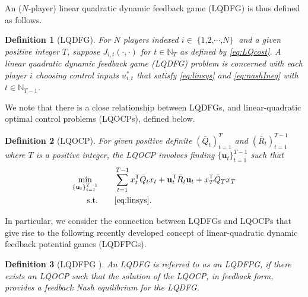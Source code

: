 \documentclass[letterpaper, 10 pt, conference]{ieeeconf}  %
\newcommand{\transpose}{\mathsf{T}}
\DeclareMathOperator{\Nplayers}{\{1,2,\cdots,\textit{N}\}}
\newtheorem{definition}{Definition}
\begin{document}
An ($N$-player) linear quadratic dynamic feedback game (LQDFG) is thus defined as follows.
\begin{definition}[LQDFG]\label{def:LQDFG}
     For $N$ players indexed $i\in\Nplayers$ and a given positive integer $T$, suppose $J_{i,t}(\cdot,\cdot)$ for $t\in\mathbb{N}_{T}$ as defined by \eqref{eq:LQcost}. A linear quadratic dynamic feedback game (LQDFG) problem is concerned with each player $i$ choosing control inputs $u_{i,t}^{*}$ that satisfy \eqref{eq:linsys} and \eqref{eq:nashIneq} with $t \in \mathbb{N}_{T-1}$. 
\end{definition}
We note that there is a close relationship between LQDFGs, and linear-quadratic optimal control problems (LQOCPs), defined below.
\begin{definition}[LQOCP]\label{def:LQOCP}
    For given positive definite $(\bar{Q}_{t})_{t=1}^{T}$ and $(\bar{R}_{t})_{t=1}^{T-1}$ where $T$ is a positive integer, the LQOCP involves finding $\{\mathbf{u}_{t}\}_{t=1}^{T-1}$ such that
    \begin{align}
    \min_{\{\mathbf{u}_{t}\}_{t=1}^{T-1}}\qquad & \sum_{t=1}^{T-1} x_{t}^{\transpose}\bar{Q}_{t}x_{t} + \mathbf{u}_{t}^{\transpose}\bar{R}_{t}\mathbf{u}_{t} + x_{T}^{\transpose}\bar{Q}_{T}x_{T}\label{eq:LQOCP}\\
    \text{s.t.} \qquad &  \eqref{eq:linsys}. \notag
\end{align}
\end{definition}
In particular, we consider the connection between LQDFGs and LQOCPs that give rise to the following recently developed concept of linear-quadratic dynamic feedback potential games (LQDFPGs).
\begin{definition}[LQDFPG \cite{prasad_structure_2023}]\label{def:LQDFPG}
    An LQDFG is referred to as an LQDFPG, if there exists an LQOCP such that the solution of the LQOCP, in feedback form, provides a feedback Nash equilibrium for the LQDFG.
\end{definition}
\end{document}
